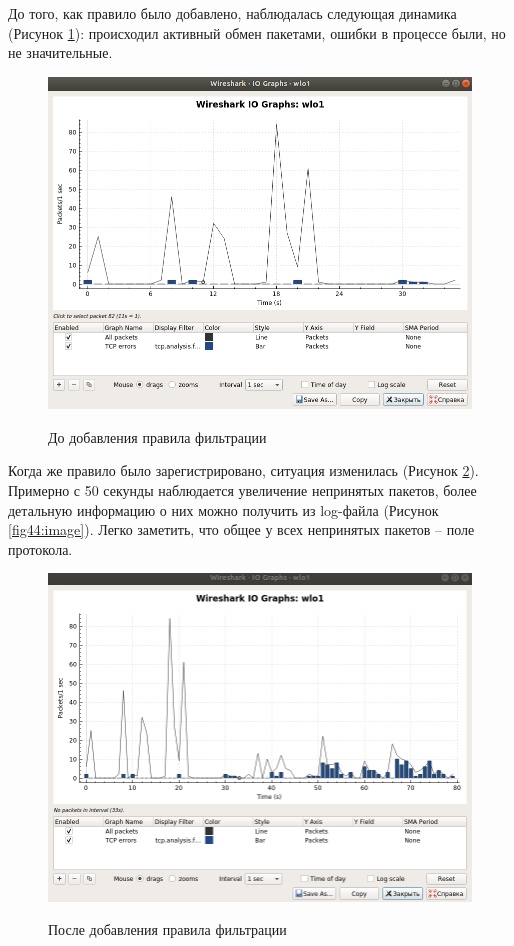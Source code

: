 До того, как правило было добавлено, наблюдалась следующая динамика (Рисунок \ref{fig42:image}): происходил активный обмен пакетами, ошибки в процессе были, но не значительные.
\begin{figure}[h]
	\begin{center}
		{\includegraphics[scale = 0.5]{img/screenshots/rule_protocol/1_rule_protocol.png}}
		\caption{До добавления правила фильтрации}
		\label{fig42:image}
	\end{center}
\end{figure}

\newpage

Когда же правило было зарегистрировано, ситуация изменилась (Рисунок \ref{fig43:image}). Примерно с 50 секунды наблюдается увеличение непринятых пакетов, более детальную информацию о них можно получить из log-файла (Рисунок \ref{fig44:image}). Легко заметить, что общее у всех непринятых пакетов -- поле протокола. 
\begin{figure}[h]
	\begin{center}
		{\includegraphics[scale = 0.5]{img/screenshots/rule_protocol/2_rule_protocol.png}}
		\caption{После добавления правила фильтрации}
		\label{fig43:image}
	\end{center}
\end{figure}

